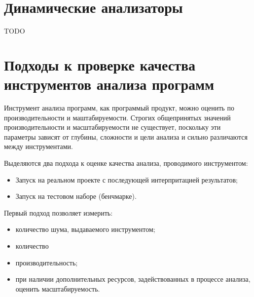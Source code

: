 \section{Динамические анализаторы}
TODO

\section{Подходы к проверке качества инструментов анализа программ}
Инструмент анализа программ, как программый продукт, можно оценить по производительности и маштабируемости. 
Строгих общепринятых значений производительности и масштабируемости не существует, поскольку эти параметры зависят от глубины, сложности и цели анализа и сильно различаются между инструментами. 

Выделяются два подхода к оценке качества анализа, проводимого инструментом:
\begin{itemize}
    \item Запуск на реальном проекте с последующей интерпритацией результатов;
    \item Запуск на тестовом наборе (бенчмарке).
\end{itemize}

Первый подход позволяет измерить:
\begin{itemize}
    \item количество шума, выдаваемого инструментом;
    \item количество  
    \item производительность; 
    \item при наличии дополнительных ресурсов, задействованных в процессе 
        анализа, оценить масштабируемость. 
\end{itemize}





\FloatBarrier
